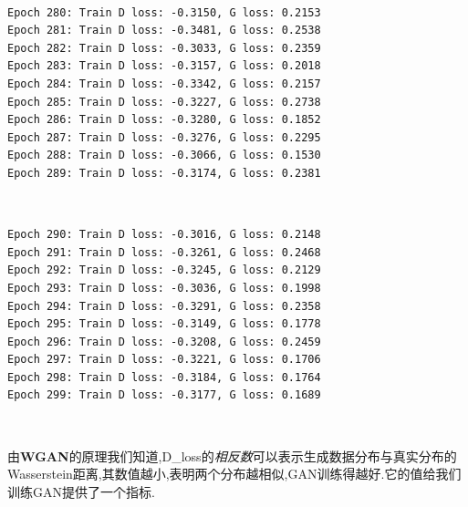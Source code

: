 \documentclass[11pt]{article}
\begin{document}
    \begin{center}
    \end{center}
    { \hspace*{\fill} \\}
    
    \begin{Verbatim}[commandchars=\\\{\}]
Epoch 280: Train D loss: -0.3150, G loss: 0.2153
Epoch 281: Train D loss: -0.3481, G loss: 0.2538
Epoch 282: Train D loss: -0.3033, G loss: 0.2359
Epoch 283: Train D loss: -0.3157, G loss: 0.2018
Epoch 284: Train D loss: -0.3342, G loss: 0.2157
Epoch 285: Train D loss: -0.3227, G loss: 0.2738
Epoch 286: Train D loss: -0.3280, G loss: 0.1852
Epoch 287: Train D loss: -0.3276, G loss: 0.2295
Epoch 288: Train D loss: -0.3066, G loss: 0.1530
Epoch 289: Train D loss: -0.3174, G loss: 0.2381

    \end{Verbatim}

    \begin{center}
    \end{center}
    { \hspace*{\fill} \\}
    
    \begin{Verbatim}[commandchars=\\\{\}]
Epoch 290: Train D loss: -0.3016, G loss: 0.2148
Epoch 291: Train D loss: -0.3261, G loss: 0.2468
Epoch 292: Train D loss: -0.3245, G loss: 0.2129
Epoch 293: Train D loss: -0.3036, G loss: 0.1998
Epoch 294: Train D loss: -0.3291, G loss: 0.2358
Epoch 295: Train D loss: -0.3149, G loss: 0.1778
Epoch 296: Train D loss: -0.3208, G loss: 0.2459
Epoch 297: Train D loss: -0.3221, G loss: 0.1706
Epoch 298: Train D loss: -0.3184, G loss: 0.1764
Epoch 299: Train D loss: -0.3177, G loss: 0.1689

    \end{Verbatim}

    \begin{center}
    \end{center}
    { \hspace*{\fill} \\}
    
    由\textbf{WGAN}的原理我们知道,D\_loss的\emph{相反数}可以表示生成数据分布与真实分布的Wasserstein距离,其数值越小,表明两个分布越相似,GAN训练得越好.它的值给我们训练GAN提供了一个指标.
\end{document}
